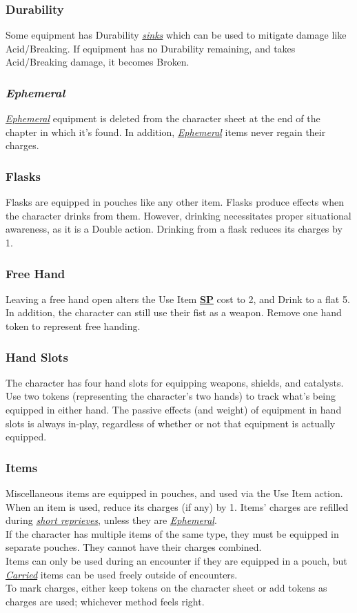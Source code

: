 \documentclass[12pt]{article}
\newcommand{\refto}[1]{\hyperlink{#1}{\textbf{#1}}}
\newcommand{\reftoit}[1]{\hyperlink{#1}{\emph{#1}}}
\begin{document}
\begin{multicols*}{2}
\subsubsection{Durability}
Some equipment has Durability \reftoit{sinks} which can be used to mitigate damage like Acid/Breaking. If equipment has no Durability remaining, and takes Acid/Breaking damage, it becomes Broken.

\subsubsection{\emph{Ephemeral}}
\hypertarget{Ephemeral}{}
\reftoit{Ephemeral} equipment is deleted from the character sheet at the end of the chapter in which it’s found. In addition, \reftoit{Ephemeral} items never regain their charges.

\subsubsection{Flasks}
Flasks are equipped in pouches like any other item. Flasks produce effects when the character drinks from them. However, drinking necessitates proper situational awareness, as it is a Double action. Drinking from a flask reduces its charges by 1.

\subsubsection{Free Hand}
Leaving a free hand open alters the Use Item \refto{SP} cost to 2, and Drink to a flat 5. In addition, the character can still use their fist as a weapon. Remove one hand token to represent free handing.

\subsubsection{Hand Slots}
The character has four hand slots for equipping weapons, shields, and catalysts. Use two tokens (representing the character’s two hands) to track what’s being equipped in either hand. The passive effects (and weight) of equipment in hand slots is always in-play, regardless of whether or not that equipment is actually equipped.

\subsubsection{Items}
Miscellaneous items are equipped in pouches, and used via the Use Item action. When an item is used, reduce its charges (if any) by 1. Items’ charges are refilled during \reftoit{short reprieves}, unless they are \reftoit{Ephemeral}.\\
If the character has multiple items of the same type, they must be equipped in separate pouches. They cannot have their charges combined.\\
Items can only be used during an encounter if they are equipped in a pouch, but \reftoit{Carried} items can be used freely outside of encounters.\\
To mark charges, either keep tokens on the character sheet or add tokens as charges are used; whichever method feels right.


\end{multicols*}
\end{document}
